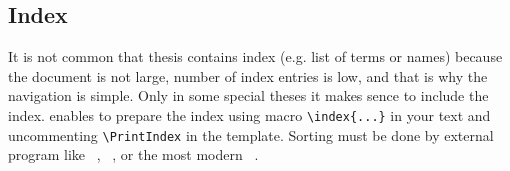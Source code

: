 \subsection{Index}
It is not common that thesis contains index (e.g. list of terms or names)
because the document is not large, number of index entries is low, and
that is why the navigation is simple. Only in some
special theses it makes sence to include the index. \FelThesis{} enables
to prepare the index using macro \verb+\index{...}+ in your text and
uncommenting \verb+\PrintIndex+ in the template. Sorting must be done by
external program like \MakeIndex{}~\cite{Chen86,Lamport87},
\CsIndex{}~\cite{Wagner92}, or the most modern \Xindy{}~\cite{xindy}.

\endinput

